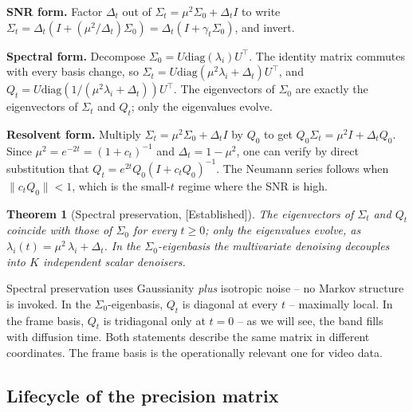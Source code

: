 \documentclass[11pt]{article}
\newtheorem{theorem}[proposition]{Theorem}
\theoremstyle{definition}
\newcommand{\Sig}{\Sigma}
\newcommand{\Detl}{\Delta_t}
\newcommand{\Established}{\textcolor{black!50!green}{\textsf{[Established]}}}
\begin{document}
\begin{derivation}
\textbf{SNR form.} Factor \(\Detl\) out of \(\Sig_t = \mu^2 \Sig_0 +
\Detl I\) to write \(\Sig_t = \Detl (I + (\mu^2 / \Detl) \Sig_0) =
\Detl (I + \gamma_t \Sig_0)\), and invert.

\textbf{Spectral form.} Decompose \(\Sig_0 = U \mathrm{diag}(\lambda_i)
U^\top\). The identity matrix commutes with every basis change, so
\(\Sig_t = U \mathrm{diag}(\mu^2 \lambda_i + \Detl) U^\top\), and
\(Q_t = U \mathrm{diag}(1 / (\mu^2 \lambda_i + \Detl)) U^\top\). The
eigenvectors of \(\Sig_0\) are exactly the eigenvectors of \(\Sig_t\)
and \(Q_t\); only the eigenvalues evolve.

\textbf{Resolvent form.} Multiply \(\Sig_t = \mu^2 \Sig_0 + \Detl I\)
by \(Q_0\) to get \(Q_0 \Sig_t = \mu^2 I + \Detl Q_0\). Since
\(\mu^2 = e^{-2 t} = (1 + c_t)^{-1}\) and \(\Detl = 1 - \mu^2\), one
can verify by direct substitution that \(Q_t = e^{2 t} Q_0 (I + c_t
Q_0)^{-1}\). The Neumann series follows when \(\| c_t Q_0 \| < 1\),
which is the small-\(t\) regime where the SNR is high.
\end{derivation}

\begin{theorem}[Spectral preservation, \Established]\label{thm:spec-pres}
The eigenvectors of \(\Sig_t\) and \(Q_t\) coincide with those of
\(\Sig_0\) for every \(t \geq 0\); only the eigenvalues evolve, as
\(\lambda_i(t) = \mu^2\, \lambda_i + \Detl\). In the
\(\Sig_0\)-eigenbasis the multivariate denoising decouples into \(K\)
independent scalar denoisers.
\end{theorem}

\begin{intuition}
Spectral preservation uses Gaussianity \emph{plus} isotropic noise --
no Markov structure is invoked. In the \(\Sig_0\)-eigenbasis,
\(Q_t\) is diagonal at every \(t\) -- maximally local. In the frame
basis, \(Q_t\) is tridiagonal only at \(t = 0\) -- as we will see, the
band fills with diffusion time. Both statements describe the same
matrix in different coordinates. The frame basis is the operationally
relevant one for video data.
\end{intuition}

\subsection{Lifecycle of the precision matrix}
\end{document}
